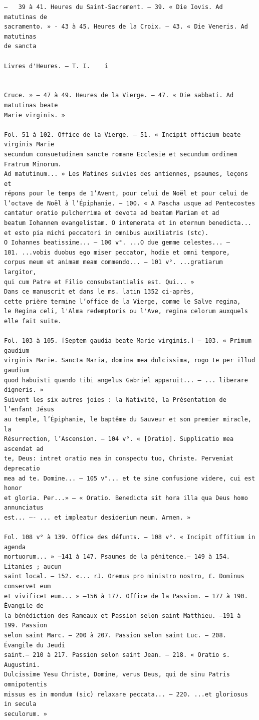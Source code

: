 \documentclass[a4paper,12pt,twoside]{book}
\begin{document}
\begin{verbatim}
—	39 à 41. Heures du Saint-Sacrement. — 39. « Die Iovis. Ad matutinas de 
sacramento. » - 43 à 45. Heures de la Croix. — 43. « Die Veneris. Ad matutinas 
de sancta

Livres d'Heures. — T. I.	i


Cruce. » — 47 à 49. Heures de la Vierge. — 47. « Die sabbati. Ad matutinas beate 
Marie virginis. »

Fol. 51 à 102. Office de la Vierge. — 51. « Incipit officium beate virginis Marie
secundum consuetudinem sancte romane Ecclesie et secundum ordinem Fratrum Minorum.
Ad matutinum... » Les Matines suivies des antiennes, psaumes, leçons et 
répons pour le temps de 1’Avent, pour celui de Noël et pour celui de 
l’octave de Noël à l’Épiphanie. — 100. « A Pascha usque ad Pentecostes 
cantatur oratio pulcherrima et devota ad beatam Mariam et ad 
beatum Iohannem evangelistam. O intemerata et in eternum benedicta... 
et esto pia michi peccatori in omnibus auxiliatris (stc).
O Iohannes beatissime... — 100 v°. ...O due gemme celestes... —
101. ...vobis duobus ego miser peccator, hodie et omni tempore, 
corpus meum et animam meam commendo... — 101 v°. ...gratiarum largitor,
qui cum Patre et Filio consubstantialis est. Qui... » 
Dans ce manuscrit et dans le ms. latin 1352 ci-après, 
cette prière termine l’office de la Vierge, comme le Salve regina, 
le Regina celi, l'Alma redemptoris ou l'Ave, regina celorum auxquels 
elle fait suite.

Fol. 103 à 105. [Septem gaudia beate Marie virginis.] — 103. « Primum gaudium 
virginis Marie. Sancta Maria, domina mea dulcissima, rogo te per illud gaudium 
quod habuisti quando tibi angelus Gabriel apparuit... — ... liberare digneris. »
Suivent les six autres joies : la Nativité, la Présentation de l’enfant Jésus 
au temple, l’Épiphanie, le baptême du Sauveur et son premier miracle, la 
Résurrection, l’Ascension. — 104 v°. « [Oratio]. Supplicatio mea ascendat ad 
te, Deus: intret oratio mea in conspectu tuo, Christe. Perveniat deprecatio 
mea ad te. Domine... — 105 v°... et te sine confusione videre, cui est honor 
et gloria. Per...» — « Oratio. Benedicta sit hora illa qua Deus homo annunciatus
est... —- ... et impleatur desiderium meum. Arnen. »

Fol. 108 v° à 139. Office des défunts. — 108 v°. « Incipit offitium in agenda
mortuorum... » —141 à 147. Psaumes de la pénitence.— 149 à 154. Litanies ; aucun 
saint local. — 152. «... rJ. Oremus pro ministro nostro, £. Dominus conservet eum
et vivificet eum... » —156 à 177. Office de la Passion. — 177 à 190. Évangile de
la bénédiction des Rameaux et Passion selon saint Matthieu. —191 à 199. Passion 
selon saint Marc. — 200 à 207. Passion selon saint Luc. — 208. Évangile du Jeudi 
saint.— 210 à 217. Passion selon saint Jean. — 218. « Oratio s. Augustini.
Dulcissime Yesu Christe, Domine, verus Deus, qui de sinu Patris omnipotentis 
missus es in mondum (sic) relaxare peccata... — 220. ...et gloriosus in secula 
seculorum. »




\end{verbatim}
\end{document}
